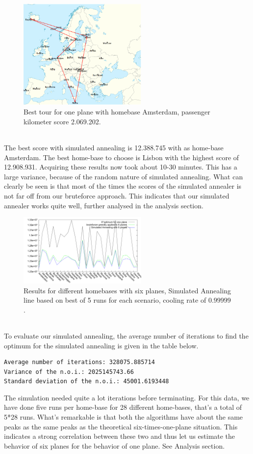 \documentclass[journal]{IEEEtran}
\begin{document}
\\
\begin{figure}[!h]
\centering
\includegraphics[width=2.5in]{best_tour_one_plane_amsterdam}
\caption{Best tour for one plane with homebase Amsterdam, passenger kilometer score 2.069.202.}
\label{fig:one_plane_amsterdam}
\end{figure}
\\
The best score with simulated annealing is 12.388.745 with as home-base Amsterdam. The best home-base to choose is Lisbon with the highest score of 12.908.931.  Acquiring these results now took about 10-30 minutes. This has a large variance, because of the random nature of simulated annealing.  What can clearly be seen is that most of the times the scores of the simulated annealer is not far off from our bruteforce approach. This indicates that our simulated annealer works quite well, further analysed in the analysis section.
\\
\begin{figure}[!h]
\centering
\includegraphics[width=2.5in]{different_homebases}
\caption{Results for different homebases with six planes, Simulated Annealing line based on best of 5 runs for each scenario, cooling rate of $0.99999$.}
\label{fig:different_homebase_six_planes}
\end{figure}
\\
To evaluate our simulated annealing, the average number of iterations to find the optimum for the simulated annealing is given in the table below. 
\begin{lstlisting}
Average number of iterations: 328075.885714
Variance of the n.o.i.: 2025145743.66
Standard deviation of the n.o.i.: 45001.6193448
\end{lstlisting}
The simulation needed quite a lot iterations before terminating. For this data, we have done five runs per home-base for 28 different home-bases, that's a total of 5*28 runs. What's remarkable is that both the algorithms have about the same peaks as the same peaks as the theoretical six-times-one-plane situation.  This indicates a strong correlation between these two and thus let us estimate the behavior of six planes for the behavior of one plane. See Analysis section. 
\\
\end{document}
